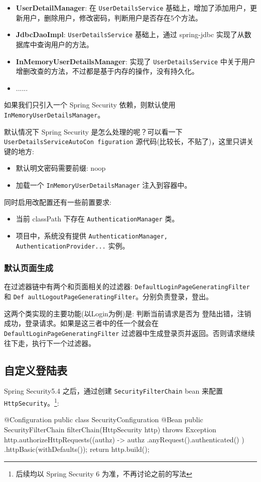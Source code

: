 \begin{itemize}
  \item \textbf{UserDetailManager}: 在 \texttt{UserDetailsService} 基础上，增加了添加用户，更新用户，删除用户，修改密码，判断用户是否存在5个方法。
  \item \textbf{JdbcDaoImpl}: \texttt{UserDetailsService} 基础上，通过 spring-jdbc 实现了从数据库中查询用户的方法。
  \item \textbf{InMemoryUserDetailsManager}: 实现了 \texttt{UserDetailsService} 中关于用户增删改查的方法，不过都是基于内存的操作，没有持久化。
  \item ......
\end{itemize}

如果我们只引入一个 Spring Security 依赖，则默认使用 \texttt{InMemoryUserDetailsManager}。

默认情况下 Spring Security 是怎么处理的呢？可以看一下 \texttt{UserDetailsServiceAutoCon figuration} 源代码(比较长，不贴了)，这里只讲关键的地方:
\begin{itemize}
  \item 默认明文密码需要前缀: {noop}
  \item 加载一个 \texttt{InMemoryUserDetailsManager} 注入到容器中。
\end{itemize}

同时启用改配置还有一些前置要求:
\begin{itemize}
  \item 当前 classPath 下存在 \texttt{AuthenticationManager} 类。
  \item 项目中，系统没有提供 \texttt{AuthenticationManager, AuthenticationProvider...} 实例。
\end{itemize}

\subsubsection*{默认页面生成}

在过滤器链中有两个和页面相关的过滤器: \texttt{DefaultLoginPageGeneratingFilter} 和 \texttt{Def aultLogoutPageGeneratingFilter}。分别负责登录，登出。

这两个类实现的主要功能(以Login为例)是: 判断当前请求是否为 登陆出错，注销成功，登录请求。如果是这三者中的任一个就会在 \texttt{DefaultLoginPageGeneratingFilter} 过滤器中生成登录页并返回。否则请求继续往下走，执行下一个过滤器。

\subsection{自定义登陆表}

Spring Security5.4 之后，通过创建 \texttt{SecurityFilterChain} bean 来配置 \texttt{HttpSecurity}。\footnote{后续均以 Spring Security 6 为准，不再讨论之前的写法}:

\begin{Java}
@Configuration
public class SecurityConfiguration {
    @Bean
    public SecurityFilterChain filterChain(HttpSecurity http) throws Exception {
        http.authorizeHttpRequests((authz) -> authz
                .anyRequest().authenticated()
            )
            .httpBasic(withDefaults());
        return http.build();
    }
}
\end{Java}